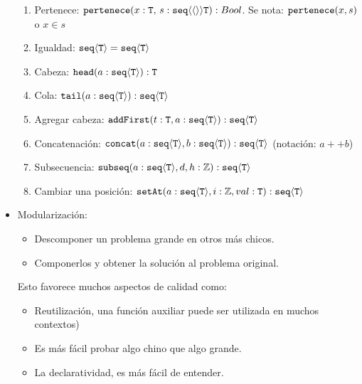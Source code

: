 \documentclass[12pt,a4paper, spanish]{article}
\begin{document}
\begin{itemize}
\begin{enumerate}
		      \item Pertenece: $\texttt{pertenece}(x: \texttt{T},\, s: \texttt{seq} \langle \langle \rangle \rangle{\texttt{T}}): Bool$. Se nota: $\texttt{pertenece}(x,s)$ o $x \in s$

		      \item Igualdad: $\texttt{seq} \langle \texttt{T} \rangle = \texttt{seq} \langle \texttt{T} \rangle $

		      \item Cabeza: $\texttt{head}(a: \texttt{seq} \langle \texttt{T} \rangle): \texttt{T}$

		      \item Cola: $\texttt{tail}(a: \texttt{seq} \langle \texttt{T} \rangle): \texttt{seq} \langle \texttt{T} \rangle$

		      \item Agregar cabeza: $\texttt{addFirst}(t: \texttt{T}, a: \texttt{seq} \langle \texttt{T} \rangle): \texttt{seq} \langle \texttt{T} \rangle$

		      \item Concatenación: $\texttt{concat}(a: \texttt{seq} \langle \texttt{T} \rangle, b: \texttt{seq} \langle \texttt{T} \rangle): \texttt{seq} \langle \texttt{T} \rangle $ (notación: $a++b$)

		      \item Subsecuencia: $\texttt{subseq}(a: \texttt{seq} \langle \texttt{T} \rangle, d, h: \mathbb Z): \texttt{seq} \langle \texttt{T} \rangle $

		      \item Cambiar una posición: $\texttt{setAt}(a: \texttt{seq} \langle \texttt{T} \rangle, i: \mathbb Z, val: \texttt{T}): \texttt{seq} \langle \texttt{T} \rangle $
	      \end{enumerate}

	\item Modularización:
	      \begin{itemize}
		      \item Descomponer un problema grande en otros más chicos.
		      \item Componerlos y obtener la solución al problema original.
	      \end{itemize}
	      Esto favorece muchos aspectos de calidad como:
	      \begin{itemize}
		      \item Reutilización, una función auxiliar puede ser utilizada en muchos contextos)
		      \item Es más fácil probar algo chino que algo grande.
		      \item La declaratividad, es más fácil de entender.
	      \end{itemize}


\end{itemize}
\end{document}
